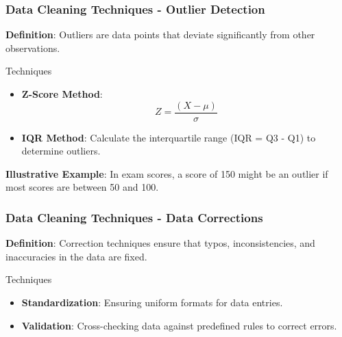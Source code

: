 \documentclass[aspectratio=169]{beamer}
\begin{document}
\begin{frame}[fragile]
    \frametitle{Data Cleaning Techniques - Outlier Detection}
    \textbf{Definition}: Outliers are data points that deviate significantly from other observations.

    \begin{block}{Techniques}
        \begin{itemize}
            \item \textbf{Z-Score Method}: 
            \begin{equation}
            Z = \frac{(X - \mu)}{\sigma}
            \end{equation}
            \item \textbf{IQR Method}: Calculate the interquartile range (IQR = Q3 - Q1) to determine outliers.
        \end{itemize}
    \end{block}
    \textbf{Illustrative Example}: In exam scores, a score of 150 might be an outlier if most scores are between 50 and 100.
\end{frame}

\begin{frame}[fragile]
    \frametitle{Data Cleaning Techniques - Data Corrections}
    \textbf{Definition}: Correction techniques ensure that typos, inconsistencies, and inaccuracies in the data are fixed.

    \begin{block}{Techniques}
        \begin{itemize}
            \item \textbf{Standardization}: Ensuring uniform formats for data entries.
            \item \textbf{Validation}: Cross-checking data against predefined rules to correct errors.
        \end{itemize}
    \end{block}
\end{frame}
\end{document}
